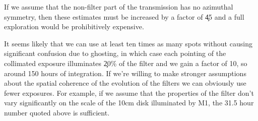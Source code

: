 If we assume that
the non-filter part of the transmission has no azimuthal symmetry, then these estimates must
be increased by a factor of \c 45 and a full exploration would be prohibitively expensive.

It seems likely that we can use at least ten times as many spots without causing significant confusion due to
ghosting, in which case each pointing of the collimated exposure illuminates \c 20\% of the filter and we gain
a factor of 10, so around 150 hours of integration.  If we're willing to make stronger assumptions about the
spatial coherence of the evolution of the filters we can obviously use fewer exposures.  For example, if we
assume that the properties of the filter don't vary significantly on the scale of the 10cm disk illuminated by
M1, the 31.5 hour number quoted above is sufficient.

\endgroup                               %

